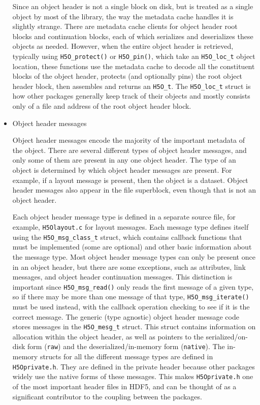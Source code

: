 \begin{itemize}
Since an object header is not a single block on disk, but is treated as a single object by most of the library, the way the metadata cache handles it is slightly strange. There are metadata cache clients for object header root blocks and continuation blocks, each of which serializes and deserializes these objects as needed. However, when the entire object header is retrieved, typically using \texttt{H5O\_protect()} or \texttt{H5O\_pin()}, which take an \texttt{H5O\_loc\_t} object location, these functions use the metadata cache to decode all the constituent blocks of the object header, protects (and optionally pins) the root object header block, then assembles and returns an \texttt{H5O\_t}. The \texttt{H5O\_loc\_t} struct is how other packages generally keep track of their objects and mostly consists only of a file and address of the root object header block.

    \item Object header messages

Object header messages encode the majority of the important metadata of the object. There are several different types of object header messages, and only some of them are present in any one object header. The type of an object is determined by which object header messages are present. For example, if a layout message is present, then the object is a dataset. Object header messages also appear in the file superblock, even though that is not an object header.

Each object header message type is defined in a separate source file, for example, \texttt{H5Olayout.c} for layout messages. Each message type defines itself using the \texttt{H5O\_msg\_class\_t} struct, which contains callback functions that must be implemented (some are optional) and other basic information about the message type. Most object header message types can only be present once in an object header, but there are some exceptions, such as attributes, link messages, and object header continuation messages. This distinction is important since \texttt{H5O\_msg\_read()} only reads the first message of a given type, so if there may be more than one message of that type, \texttt{H5O\_msg\_iterate()} must be used instead, with the callback operation checking to see if it is the correct message. The generic (type agnostic) object header message code stores messages in the \texttt{H5O\_mesg\_t} struct. This struct contains information on allocation within the object header, as well as pointers to the serialized/on-disk form (\texttt{raw}) and the deserialized/in-memory form (\texttt{native}). The in-memory structs for all the different message types are defined in \texttt{H5Oprivate.h}. They are defined in the private header because other packages widely use the native forms of these messages. This makes \texttt{H5Oprivate.h} one of the most important header files in HDF5, and can be thought of as a significant contributor to the coupling between the packages.


\end{itemize}
